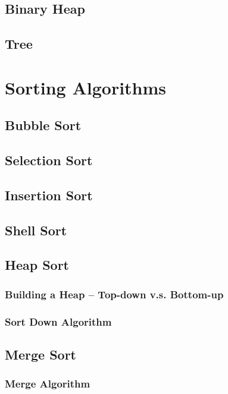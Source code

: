 \documentclass{article}
\begin{document}
\subsection{Binary Heap}

\subsection{Tree}

\section{Sorting Algorithms}

\subsection{Bubble Sort}

\subsection{Selection Sort}

\subsection{Insertion Sort}

\subsection{Shell Sort}

\subsection{Heap Sort}

\subsubsection{Building a Heap -- Top-down v.s. Bottom-up}

\subsubsection{Sort Down Algorithm}

\subsection{Merge Sort}

\subsubsection{Merge Algorithm}
\end{document}
